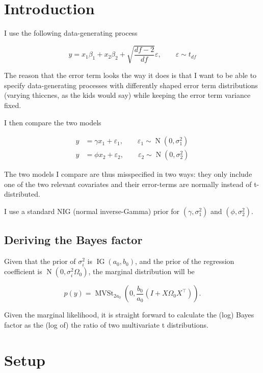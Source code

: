 \documentclass{article}
\begin{document}
\section{Introduction}

I use the following data-generating process

\begin{equation*}
    y = x_1 \beta_1 + x_2 \beta_2 + \sqrt{\frac{df-2}{df}}\varepsilon, \qquad \varepsilon \sim t_{df}
\end{equation*}

The reason that the error term looks the way it does is that I want to be able to specify data-generating processes with differently shaped error term distributions (varying thiccnes, as the kids would say) while keeping the error term variance fixed.

I then compare the two models

\begin{align*}
    y &= \gamma x_1 + \varepsilon_1, \qquad \varepsilon_1 \sim \operatorname{N}(0, \sigma_1^2) \\
    y &= \phi x_2 + \varepsilon_2, \qquad \varepsilon_2 \sim \operatorname{N}(0, \sigma_2^2)
\end{align*}

The two models I compare are thus misspecified in two ways: they only include one of the two relevant covariates and their error-terms are normally instead of t-distributed. 

I use a standard NIG (normal inverse-Gamma) prior for $(\gamma,\sigma_1^2)$ and $(\phi, \sigma_2^2)$.

\subsection{Deriving the Bayes factor}

Given that the prior of $\sigma_i^2$ is $\operatorname{IG}(a_0,b_0)$, and the prior of the regression coefficient is $\operatorname{N}(0, \sigma_i^2\Omega_0)$, the marginal distribution will be

\begin{equation*}
    p(y) = \operatorname{MVSt}_{2a_0}\left(0,\frac{b_0}{a_0}(I+X\Omega_0 X^{\intercal})\right).
\end{equation*}

Given the marginal likelihood, it is straight forward to calculate the (log) Bayes factor as the (log of) the ratio of two multivariate t distributions.

\section{Setup}
\end{document}

